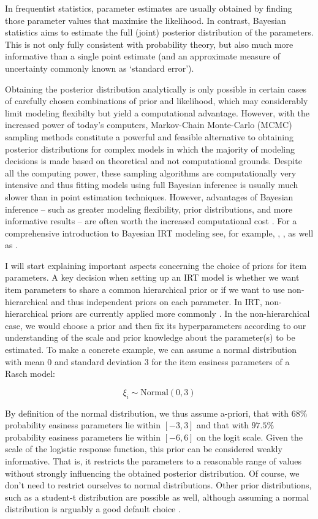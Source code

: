 \documentclass[
]{jss}
\begin{document}
In frequentist statistics, parameter estimates are usually obtained by
finding those parameter values that maximise the likelihood. In
contrast, Bayesian statistics aims to estimate the full (joint)
posterior distribution of the parameters. This is not only fully
consistent with probability theory, but also much more informative than
a single point estimate (and an approximate measure of uncertainty
commonly known as `standard error').

Obtaining the posterior distribution analytically is only possible in
certain cases of carefully chosen combinations of prior and likelihood,
which may considerably limit modeling flexibilty but yield a
computational advantage. However, with the increased power of today's
computers, Markov-Chain Monte-Carlo (MCMC) sampling methods constitute a
powerful and feasible alternative to obtaining posterior distributions
for complex models in which the majority of modeling decisions is made
based on theoretical and not computational grounds. Despite all the
computing power, these sampling algorithms are computationally very
intensive and thus fitting models using full Bayesian inference is
usually much slower than in point estimation techniques. However,
advantages of Bayesian inference -- such as greater modeling
flexibility, prior distributions, and more informative results -- are
often worth the increased computational cost \citep{gelman2013}. For a
comprehensive introduction to Bayesian IRT modeling see, for example,
\citet{fox2010}, \citet{levy2017}, as well as \citet{rupp2004}.

I will start explaining important aspects concerning the choice of
priors for item parameters. A key decision when setting up an IRT model
is whether we want item parameters to share a common hierarchical prior
or if we want to use non-hierarchical and thus independent priors on
each parameter. In IRT, non-hierarchical priors are currently applied
more commonly \citep[e.g.,][]{fox2010, levy2017}. In the
non-hierarchical case, we would choose a prior and then fix its
hyperparameters according to our understanding of the scale and prior
knowledge about the parameter(s) to be estimated. To make a concrete
example, we can assume a normal distribution with mean \(0\) and
standard deviation \(3\) for the item easiness parameters of a Rasch
model:

\[
\xi_i \sim \text{Normal}(0, 3)
\]

By definition of the normal distribution, we thus assume a-priori, that
with \(68\%\) probability easiness parameters lie within \([-3, 3]\) and
that with \(97.5\%\) probability easiness parameters lie within
\([-6, 6]\) on the logit scale. Given the scale of the logistic response
function, this prior can be considered weakly informative. That is, it
restricts the parameters to a reasonable range of values without
strongly influencing the obtained posterior distribution. Of course, we
don't need to restrict ourselves to normal distributions. Other prior
distributions, such as a student-t distribution are possible as well,
although assuming a normal distribution is arguably a good default
choice \citep[see also][]{mcelreath2017}.
\end{document}
